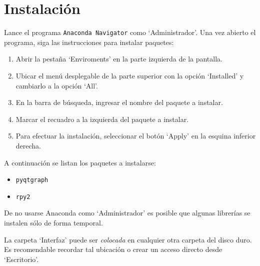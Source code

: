 \documentclass[twoside,a4paper]{refart}
\begin{document}

\section{Instalación}


Lance el programa \texttt{Anaconda Navigator} como `Administrador'. 
%
Una vez abierto el programa, siga las instrucciones para instalar paquetes:
\begin{enumerate}
\item Abrir la pestaña `Enviroments' en la parte izquierda de la pantalla.
\item Ubicar el menú desplegable de la parte superior con la opción `Installed' y 
cambiarlo a la opción `All'.
\item En la barra de búsqueda, ingresar el nombre del paquete a instalar.
\item Marcar el recuadro a la izquierda del paquete a instalar.
\item Para efectuar la instalación, seleccionar el botón `Apply' en la esquina 
inferior derecha.
\end{enumerate}
A continuación se listan los paquetes a instalarse:
\begin{itemize}
\item \texttt{pyqtgraph}
\item \texttt{rpy2}
\end{itemize}

\attention
De no usarse Anaconda como `Administrador' es posible que algunas librerías se instalen
sólo de forma temporal.

La carpeta `Interfaz' puede ser \textit{colocada} en cualquier otra carpeta del disco duro.
%
Es recomendable recordar tal ubicación o crear un acceso directo desde `Escritorio'.
\end{document}
